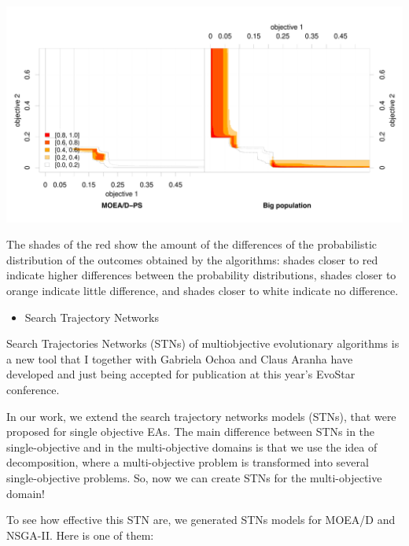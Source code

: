 \documentclass[
]{article}
\providecommand{\tightlist}{%
  \setlength{\itemsep}{0pt}\setlength{\parskip}{0pt}}
\begin{document}
\begin{center}\includegraphics[width=67.06in]{imgs/eaf_UF6_big_vs_ps} \end{center}

The shades of the red show the amount of the differences of the
probabilistic distribution of the outcomes obtained by the algorithms:
shades closer to red indicate higher differences between the probability
distributions, shades closer to orange indicate little difference, and
shades closer to white indicate no difference.

\begin{itemize}
\tightlist
\item
  Search Trajectory Networks
\end{itemize}

Search Trajectories Networks (STNs) of multiobjective evolutionary
algorithms is a new tool that I together with Gabriela Ochoa and Claus
Aranha have developed and just being accepted for publication at this
year's EvoStar conference.

In our work, we extend the search trajectory networks models (STNs),
that were proposed for single objective EAs. The main difference between
STNs in the single-objective and in the multi-objective domains is that
we use the idea of decomposition, where a multi-objective problem is
transformed into several single-objective problems. So, now we can
create STNs for the multi-objective domain!

To see how effective this STN are, we generated STNs models for MOEA/D
and NSGA-II. Here is one of them:
\end{document}
